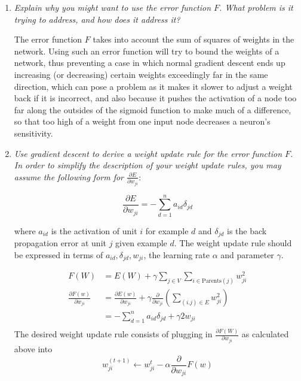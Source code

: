 \documentclass{article}
\newcommand{\edit}[1]{}
\newcommand{\dee}[2]{\frac{\partial{#1}}{\partial{#2}}}
\begin{document}
  \begin{enumerate}
  \item \textit{Explain why you might want to use the error function
    $F$. What problem is it trying to address, and how does it address
    it?}

    The error function $F$ takes into account the sum of squares of weights
    in the network. Using such an error function will try to bound the
    weights of a network, thus preventing a case in which normal gradient
    descent ends up increasing (or decreasing) certain weights exceedingly far
    in the same direction, which can pose a problem as it makes it 
    slower to adjust a weight back if it is incorrect, and also because it pushes
    the activation of a node too far along the outsides of the sigmoid
    function to make much of a difference, so that too high of a weight
    from one input node decreases a neuron's sensitivity. 
    \edit{????....}

  \item \textit{Use gradient descent to derive a weight update rule
    for the error function $F$. In order to simplify the description
    of your weight update rules, you may assume the following form for
    $\frac{\partial E}{\partial w_{ji}}$}:

    \[\frac{\partial E}{\partial w_{ji}} = -\sum_{d=1}^n a_{id}\delta_{jd}\]

    where $a_{id}$ is the activation of unit $i$ for example $d$ and
    $\delta_{jd}$ is the back propagation error at unit $j$ given
    example $d$. The weight update rule should be expressed in terms
    of $a_{id},\delta_{jd},w_{ji}$, the learning rate $\alpha$ and
    parameter $\gamma$.

    \begin{align*}
      F(W) & = E(W)+\gamma\sum_{j\in V}\sum_{i\in \text{Parents}(j)} w_{ji}^2 \\
      \dee{F(w)}{w_{ji}} & = \dee{E(w)}{w_{ji}} + \gamma \dee{}{w_{ji}} \left( \sum_{(i.j)\in E} w_{ji}^2\right) \\
      & = -\sum_{d=1}^n a_{id} \delta_{jd}+ \gamma 2w_{ji}\\
    \end{align*}
    The desired weight update rule consists of plugging in $\dee{F(W)}{w_{ji}}$ as calculated
    above into 
    $$w_{ji}^{(t+1)}\leftarrow w_{ji}^t-\alpha \dee{}{w_{ji}} F(w)$$
  \end{enumerate}
\end{document}
